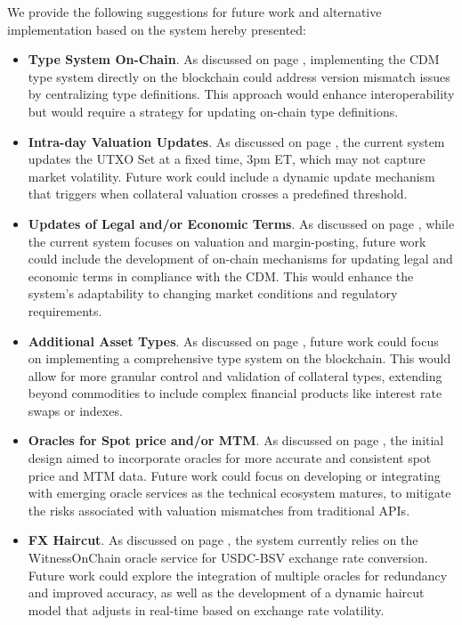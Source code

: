 We provide the following suggestions for future work and alternative implementation based on the system hereby presented:

\begin{itemize}
    \item \textbf{Type System On-Chain}. As discussed on page \pageref{item:wallet}, implementing the CDM type system directly on the blockchain could address version mismatch issues by centralizing type definitions. This approach would enhance interoperability but would require a strategy for updating on-chain type definitions.

    \item \textbf{Intra-day Valuation Updates}. As discussed on page \pageref{ny3pm}, the current system updates the UTXO Set at a fixed time, 3pm ET, which may not capture market volatility. Future work could include a dynamic update mechanism that triggers when collateral valuation crosses a predefined threshold.

    \item \textbf{Updates of Legal and/or Economic Terms}. As discussed on page \pageref{item:legal_econ_terms}, while the current system focuses on valuation and margin-posting, future work could include the development of on-chain mechanisms for updating legal and economic terms in compliance with the CDM. This would enhance the system's adaptability to changing market conditions and regulatory requirements.

    \item \textbf{Additional Asset Types}. As discussed on page \pageref{item:other_assets}, future work could focus on implementing a comprehensive type system on the blockchain. This would allow for more granular control and validation of collateral types, extending beyond commodities to include complex financial products like interest rate swaps or indexes.
    
    \item \textbf{Oracles for Spot price and/or MTM}. As discussed on page \pageref{item:legal_econ_terms}, the initial design aimed to incorporate oracles for more accurate and consistent spot price and MTM data. Future work could focus on developing or integrating with emerging oracle services as the technical ecosystem matures, to mitigate the risks associated with valuation mismatches from traditional APIs.
    
    \item \textbf{FX Haircut}. As discussed on page \pageref{item:valuation}, the system currently relies on the WitnessOnChain oracle service for USDC-BSV exchange rate conversion. Future work could explore the integration of multiple oracles for redundancy and improved accuracy, as well as the development of a dynamic haircut model that adjusts in real-time based on exchange rate volatility.
    

\end{itemize}

